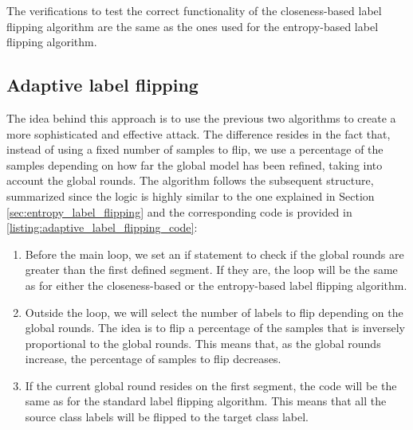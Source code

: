 The verifications to test the correct functionality of the closeness-based label flipping algorithm are the same as the ones used for the entropy-based label flipping algorithm.

\subsection{Adaptive label flipping}\label{sec:adaptive_label_flipping}
The idea behind this approach is to use the previous two algorithms to create a more sophisticated and effective attack. The difference resides in the fact that, instead of using a fixed number of samples to flip, we use a percentage of the samples depending on how far the global model has been refined, taking into account the global rounds. The algorithm follows the subsequent structure, summarized since the logic is highly similar to the one explained in Section \ref{sec:entropy_label_flipping} and the corresponding code is provided in \autoref{listing:adaptive_label_flipping_code}:
\begin{enumerate}
        \item Before the main loop, we set an if statement to check if the global rounds are greater than the first defined segment. If they are, the loop will be the same as for either the closeness-based or the entropy-based label flipping algorithm. 
        \item Outside the loop, we will select the number of labels to flip depending on the global rounds. The idea is to flip a percentage of the samples that is inversely proportional to the global rounds. This means that, as the global rounds increase, the percentage of samples to flip decreases.
        \item If the current global round resides on the first segment, the code will be the same as for the standard label flipping algorithm. This means that all the source class labels will be flipped to the target class label.
\end{enumerate}



